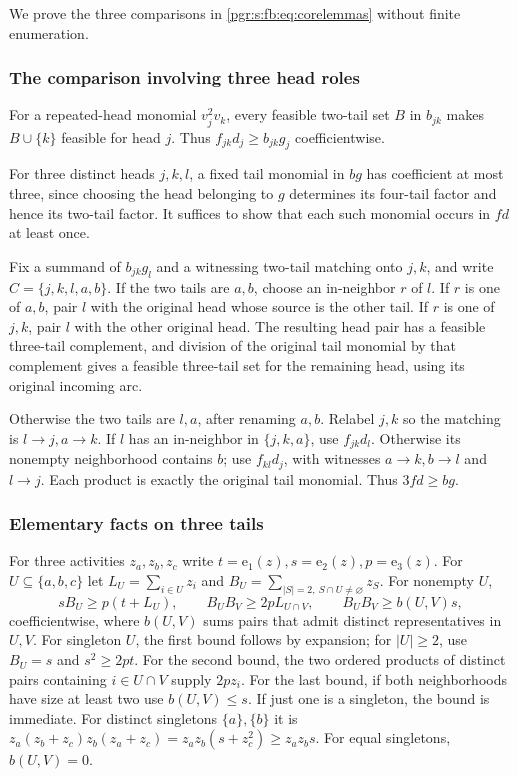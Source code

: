 \documentclass[11pt]{article}
\numberwithin{equation}{section}
\theoremstyle{definition}\newtheorem{definition}[theorem]{Definition}\newtheorem{remark}[theorem]{Remark}
\newcommand{\ee}{\mathrm e}                %
\begin{document}
We prove the three comparisons in \eqref{pgr:s:fb:eq:corelemmas} without finite enumeration.

\subsubsection{The comparison involving three head roles}
For a repeated-head monomial $v_j^2v_k$, every feasible two-tail set $B$ in $b_{jk}$ makes $B\cup\{k\}$ feasible for head $j$. Thus $f_{jk}d_j\ge b_{jk}g_j$ coefficientwise.

For three distinct heads $j,k,l$, a fixed tail monomial in $bg$ has coefficient at most three, since choosing the head belonging to $g$ determines its four-tail factor and hence its two-tail factor. It suffices to show that each such monomial occurs in $fd$ at least once.

Fix a summand of $b_{jk}g_l$ and a witnessing two-tail matching onto $j,k$, and write $C=\{j,k,l,a,b\}$. If the two tails are $a,b$, choose an in-neighbor $r$ of $l$. If $r$ is one of $a,b$, pair $l$ with the original head whose source is the other tail. If $r$ is one of $j,k$, pair $l$ with the other original head. The resulting head pair has a feasible three-tail complement, and division of the original tail monomial by that complement gives a feasible three-tail set for the remaining head, using its original incoming arc.

Otherwise the two tails are $l,a$, after renaming $a,b$. Relabel $j,k$ so the matching is $l\to j,a\to k$. If $l$ has an in-neighbor in $\{j,k,a\}$, use $f_{jk}d_l$. Otherwise its nonempty neighborhood contains $b$; use $f_{kl}d_j$, with witnesses $a\to k,b\to l$ and $l\to j$. Each product is exactly the original tail monomial. Thus $3fd\ge bg$.

\subsubsection{Elementary facts on three tails}
For three activities $z_a,z_b,z_c$ write $t=\ee_1(z),s=\ee_2(z),p=\ee_3(z)$.
For $U\subseteq\{a,b,c\}$ let $L_U=\sum_{i\in U}z_i$ and
$B_U=\sum_{|S|=2,\ S\cap U\ne\varnothing}z_S$.
For nonempty $U$,
\begin{equation}\label{pgr:s:fb:eq:aux}
 sB_U\ge p(t+L_U),\qquad
 B_UB_V\ge2pL_{U\cap V},\qquad
 B_UB_V\ge b(U,V)s,
\end{equation}
coefficientwise, where $b(U,V)$ sums pairs that admit distinct representatives in $U,V$.
For singleton $U$, the first bound follows by expansion; for $|U|\ge2$, use $B_U=s$ and $s^2\ge2pt$. For the second bound, the two ordered products of distinct pairs containing $i\in U\cap V$ supply $2pz_i$. For the last bound, if both neighborhoods have size at least two use $b(U,V)\le s$. If just one is a singleton, the bound is immediate. For distinct singletons $\{a\},\{b\}$ it is
$z_a(z_b+z_c)z_b(z_a+z_c)=z_az_b(s+z_c^2)\ge z_az_bs$.
For equal singletons, $b(U,V)=0$.
\end{document}

